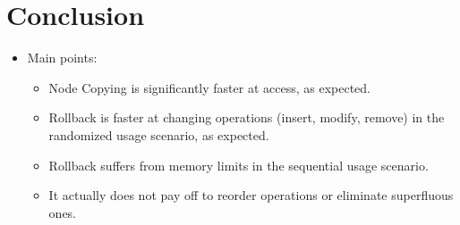 \chapter{Conclusion}

\begin{itemize}

  \item Main points:

  \begin{itemize}

    \item Node Copying is significantly faster at access, as expected.

    \item Rollback is faster at changing operations (insert, modify, remove) in
    the randomized usage scenario, as expected.

    \item Rollback suffers from memory limits in the sequential usage scenario.

    \item It actually does not pay off to reorder operations or eliminate
    superfluous ones.

  \end{itemize}

\end{itemize}


